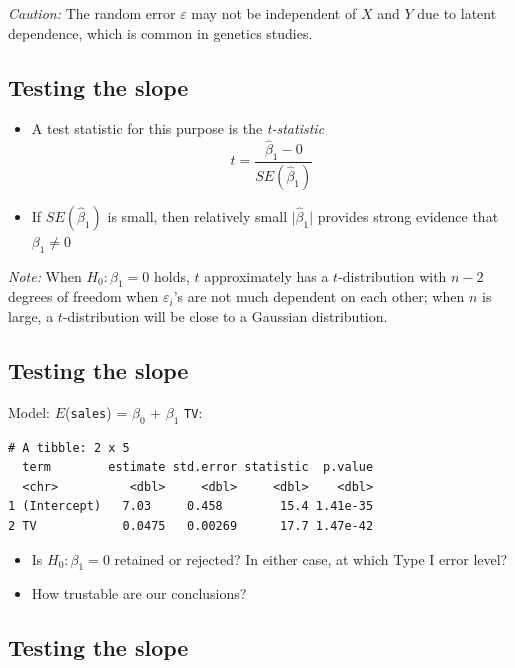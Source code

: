 \documentclass[]{article}
\providecommand{\tightlist}{%
  \setlength{\itemsep}{0pt}\setlength{\parskip}{0pt}}
\begin{document}
\emph{Caution:} The random error \(\varepsilon\) may not be independent
of \(X\) and \(Y\) due to latent dependence, which is common in genetics
studies.

\subsection{Testing the slope}\label{testing-the-slope-1}

\begin{itemize}
\tightlist
\item
  A test statistic for this purpose is the \emph{t-statistic}
  \[t = \frac{\hat{\beta}_1 - 0}{SE(\hat{\beta}_1)}\]
\item
  If \(SE(\hat{\beta}_1)\) is small, then relatively small
  \(\vert \hat{\beta}_1\vert\) provides strong evidence that
  \(\beta_1 \ne 0\)
\end{itemize}

\emph{Note:} When \(H_0: \beta_1=0\) holds, \(t\) approximately has a
\(t\)-distribution with \(n-2\) degrees of freedom when
\(\varepsilon_i\)'s are not much dependent on each other; when \(n\) is
large, a \(t\)-distribution will be close to a Gaussian distribution.

\subsection{Testing the slope}\label{testing-the-slope-2}

Model: \(E\)(\texttt{sales}) = \(\beta_0\) + \(\beta_1\) \texttt{TV}:

\begin{verbatim}
# A tibble: 2 x 5
  term        estimate std.error statistic  p.value
  <chr>          <dbl>     <dbl>     <dbl>    <dbl>
1 (Intercept)   7.03     0.458        15.4 1.41e-35
2 TV            0.0475   0.00269      17.7 1.47e-42
\end{verbatim}

\begin{itemize}
\tightlist
\item
  Is \(H_0: \beta_1=0\) retained or rejected? In either case, at which
  Type I error level?
\item
  How trustable are our conclusions?
\end{itemize}

\subsection{Testing the slope}\label{testing-the-slope-3}
\end{document}
